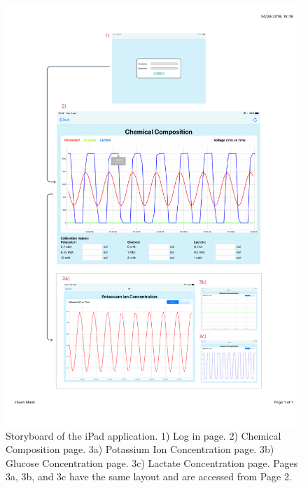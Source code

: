 \begin{figure}[p]
\centering
\includegraphics[trim={1cm 2.5cm 1cm  2cm}, clip, width=1\textwidth]{./figures/appStoryboard3.pdf}
\captionsetup{justification=centering}
\caption{Storyboard of the iPad application. 1) Log in page. 2) Chemical Composition page. 3a) Potassium Ion Concentration page. 3b) Glucose Concentration page. 3c) Lactate Concentration page. Pages 3a, 3b, and 3c have the same layout and are accessed from Page 2.}
\label{fig: storyboard}
\end{figure}


